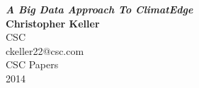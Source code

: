 {
    \fancyhf{}
}
\begin{titlepage}
    \vspace*{\fill}
    \begin{center}
        \textbf{\textit{\Large A Big Data Approach To ClimatEdge}}\\ [.5cm]
        \textbf{Christopher Keller}\\[.25cm]
        CSC\\[.25cm]
        ckeller22@csc.com\\[.25cm]
        CSC Papers\\[.25cm]
        2014\\
    \end{center}
    \vspace*{\fill}
    \thispagestyle{firststyle}
\end{titlepage}
